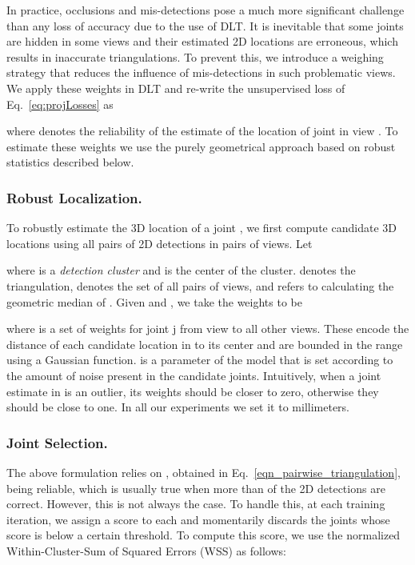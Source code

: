 \documentclass[runningheads]{llncs}
\begin{document}
In practice, occlusions and mis-detections pose a much more significant challenge than any loss of accuracy due to the use of DLT. It is inevitable that some joints are hidden in some views and their estimated 2D locations  are erroneous, which results in inaccurate triangulations. To prevent this, we introduce a weighing strategy that reduces the influence of mis-detections in such problematic views. We apply these weights in DLT and re-write the unsupervised loss of Eq.~\ref{eq:projLosses} as

where  denotes the reliability of the estimate of the location of joint  in view . To estimate these weights we use the purely geometrical approach based on robust statistics described below.


\subsubsection{Robust Localization.}

To robustly estimate the 3D location of a joint  , we first compute candidate 3D locations using all pairs of 2D detections   in pairs of views. Let 

where  is a {\it detection cluster} and  is the center of the cluster.
 denotes the triangulation,  denotes the set of all pairs of views, and  refers to calculating the geometric median of . 
Given  and , we take the weights to be

where  is a set of weights for joint j from view  to all other views. These encode the distance of each candidate location in  to its center and are bounded in the range  using a Gaussian function.  is a parameter of the model that is  set according to the amount of noise present in the candidate joints. Intuitively, when a joint estimate in  is an outlier, its weights should be closer to zero, otherwise they should be close to one. In all our experiments we set it to  millimeters.





\subsubsection{Joint Selection.}
\label{sec:jointSelect}

The above formulation relies on , obtained in Eq.~\ref{eqn_pairwise_triangulation}, being reliable, which is usually true when more than  of the 2D detections are correct. However, this is not always the case. To handle this, at each training iteration, we assign a score to each  and momentarily discards the joints whose score is below a certain threshold. 
To compute this score, we use the normalized Within-Cluster-Sum of Squared Errors (WSS) as follows:
\end{document}
